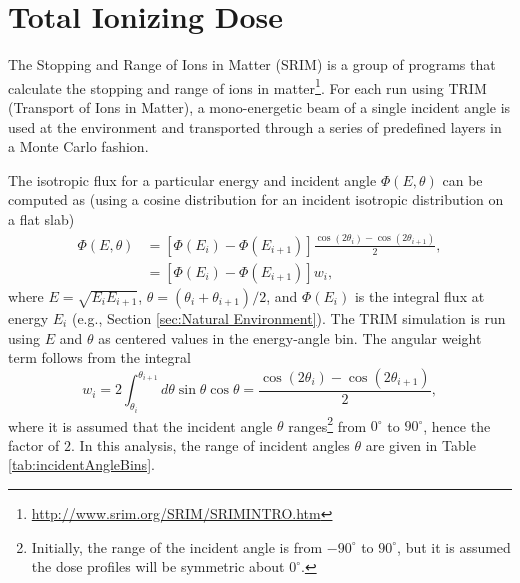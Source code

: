 \documentclass{hitec}
\begin{document}
\section{Total Ionizing Dose}

The Stopping and Range of Ions in Matter (SRIM) is a group of programs that calculate the stopping and range of ions in matter\footnote{\url{http://www.srim.org/SRIM/SRIMINTRO.htm}}. %
For each run using TRIM (Transport of Ions in Matter), a mono-energetic beam of a single incident angle is used at the environment and transported through a series of predefined layers in a Monte Carlo fashion.

The isotropic flux for a particular energy and incident angle $\Phi(E,\theta)$ can be computed as (using a cosine distribution for an incident isotropic distribution on a flat slab)
\begin{align}
	\Phi(E,\theta) &= [\Phi(E_i) - \Phi(E_{i+1})] \frac{\cos(2\theta_i) - \cos(2\theta_{i+1})}{2},\nonumber\\
	&= [\Phi(E_i) - \Phi(E_{i+1})] w_i,
\end{align}
where $E = \sqrt{E_i E_{i+1}}$, $\theta = (\theta_i + \theta_{i+1})/2$, and $\Phi(E_i)$ is the integral flux at energy $E_i$ (e.g., Section \ref{sec:Natural Environment}). The TRIM simulation is run using $E$ and $\theta$ as centered values in the energy-angle bin. The angular weight term follows from the integral
\begin{equation}
	w_i = 2\int_{\theta_i}^{\theta_{i+1}}d\theta\sin\theta\cos\theta = \frac{\cos(2\theta_i) - \cos(2\theta_{i+1})}{2},
\end{equation}
where it is assumed that the incident angle $\theta$ ranges\footnote{Initially, the range of the incident angle is from $-90^\circ$ to $90^\circ$, but it is assumed the dose profiles will be symmetric about $0^\circ$.} from $0^\circ$ to $90^\circ$, hence the factor of $2$. In this analysis, the range of incident angles $\theta$ are given in Table \ref{tab:incidentAngleBins}.
\end{document}
